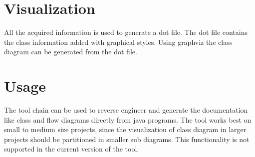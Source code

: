 \section*{Visualization}
All the acquired information is used to generate a dot file. The dot file contains the class information added with graphical styles. Using graphviz the class diagram can be generated from the dot file.

\section*{Usage}
The tool chain can be used to reverse engineer and generate the documentation like class and flow diagrams directly from java programs. The tool works best on small to medium size projects, since the visualization of class diagram in larger projects should be partitioned in smaller sub diagrams. This functionality is not supported in the current version of the tool. 